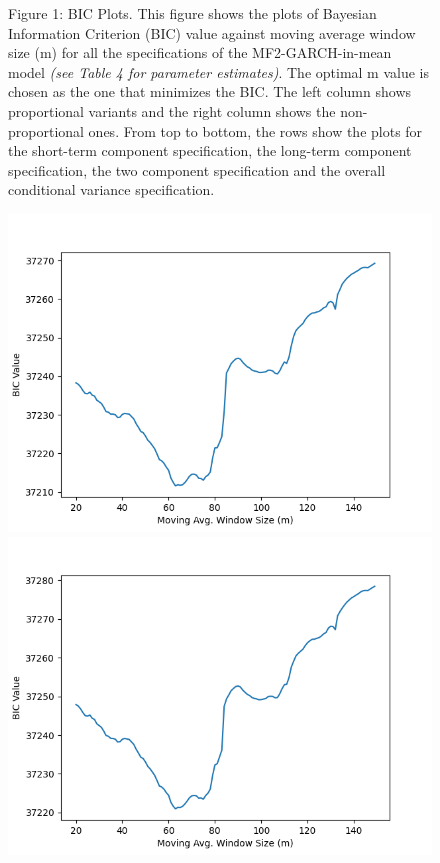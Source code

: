 \documentclass{article}
\begin{document}
\graphicspath{{BICPlots/}}


\begin{figure}[!ht]
Figure 1: BIC Plots. This figure shows the plots of Bayesian Information Criterion (BIC) value against moving average window size (m) for all the specifications of the MF2-GARCH-in-mean model \textit{(see Table 4 for parameter estimates)}. The optimal m value is chosen as the one that minimizes the BIC. The left column shows proportional variants and the right column shows the non-proportional ones. From top to bottom, the rows show the plots for the short-term component specification, the long-term component specification, the two component specification and the overall conditional variance specification.\\
\begin{center}
\begin{spacing}{0.5}
\includegraphics[scale=0.3]{Prop_ST_Cr}
\includegraphics[scale=0.3]{ST_Cr}

\end{spacing}
\end{center}
\end{figure}
\end{document}

